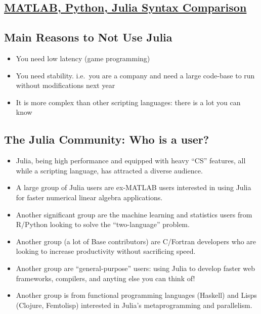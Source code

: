 \documentclass[11pt]{article}
\providecommand{\tightlist}{%
      \setlength{\itemsep}{0pt}\setlength{\parskip}{0pt}}
\begin{document}
    \hypertarget{matlab-python-julia-syntax-comparison}{%
\subsection{\texorpdfstring{\href{http://cheatsheets.quantecon.org/}{MATLAB,
Python, Julia Syntax
Comparison}}{MATLAB, Python, Julia Syntax Comparison}}\label{matlab-python-julia-syntax-comparison}}

    \hypertarget{main-reasons-to-not-use-julia}{%
\subsection{Main Reasons to Not Use
Julia}\label{main-reasons-to-not-use-julia}}

\begin{itemize}
\tightlist
\item
  You need low latency (game programming)
\item
  You need stability. i.e.~you are a company and need a large code-base
  to run without modifications next year
\item
  It is more complex than other scripting languages: there is a lot you
  can know
\end{itemize}

    \hypertarget{the-julia-community-who-is-a-user}{%
\subsection{The Julia Community: Who is a
user?}\label{the-julia-community-who-is-a-user}}

\begin{itemize}
\tightlist
\item
  Julia, being high performance and equipped with heavy ``CS'' features,
  all while a scripting language, has attracted a diverse audience.
\item
  A large group of Julia users are ex-MATLAB users interested in using
  Julia for faster numerical linear algebra applications.
\item
  Another significant group are the machine learning and statistics
  users from R/Python looking to solve the ``two-language'' problem.
\item
  Another group (a lot of Base contributors) are C/Fortran developers
  who are looking to increase productivity without sacrificing speed.
\item
  Another group are ``general-purpose'' users: using Julia to develop
  faster web frameworks, compilers, and anyting else you can think of!
\item
  Another group is from functional programming languages (Haskell) and
  Lisps (Clojure, Femtolisp) interested in Julia's metaprogramming and
  parallelism.
\end{itemize}
\end{document}
